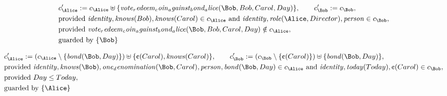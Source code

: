 \fi
\begin{align*}
&
c'_
{
\Alice
}
 := 
c_
{
\Alice
}
 \uplus 
\{
\mathit{
vote_redeem_coin_against_bond_alice
}
(
\Bob
,
Bob
,
Carol
,
Day
)
\}
, \qquad 
c'_
{
\Bob
}
 := 
c_
{
\Bob
}
,\\
&
\text{provided } 
\mathit{
identity
}
,
\mathit{
knows
}
(
Bob
)
,
\mathit{
knows
}
(
Carol
)
 \in c_
{
\Alice
}
 \text{ and } 
\mathit{
identity
}
,
\mathit{
role
}
(
\Alice
,
Director
)
,
\mathit{
person
}
 \in c_
{
\Bob
}
,\\
&
\text{provided } 
\mathit{
vote_redeem_coin_against_bond_alice
}
(
\Bob
,
Bob
,
Carol
,
Day
)
 \notin c_
{
\Alice
}
,\\
&
\text{guarded by } \{
\Bob
\}
\end{align*}

\begin{align*}
&
c'_
{
\Alice
}
 := 
(c_
{
\Alice
}
 \setminus 
\{
\mathit{
bond
}
(
\Bob
,
Day
)
\}
) \uplus 
\{
\text{\textcent}
(
Carol
)
,
\mathit{
knows
}
(
Carol
)
\}
, \qquad 
c'_
{
\Bob
}
 := 
(c_
{
\Bob
}
 \setminus 
\{
\text{\textcent}
(
Carol
)
\}
) \uplus 
\{
\mathit{
bond
}
(
\Bob
,
Day
)
\}
,\\
&
\text{provided } 
\mathit{
identity
}
,
\mathit{
knows
}
(
\Bob
)
,
\mathit{
one_denomination
}
(
\Bob
,
Carol
)
,
\mathit{
person
}
,
\mathit{
bond
}
(
\Bob
,
Day
)
 \in c_
{
\Alice
}
 \text{ and } 
\mathit{
identity
}
,
\mathit{
today
}
(
Today
)
,
\text{\textcent}
(
Carol
)
 \in c_
{
\Bob
}
,\\
&
\text{provided } 
Day
\le
Today
,\\
&
\text{guarded by } \{
\Alice
\}
\end{align*}

